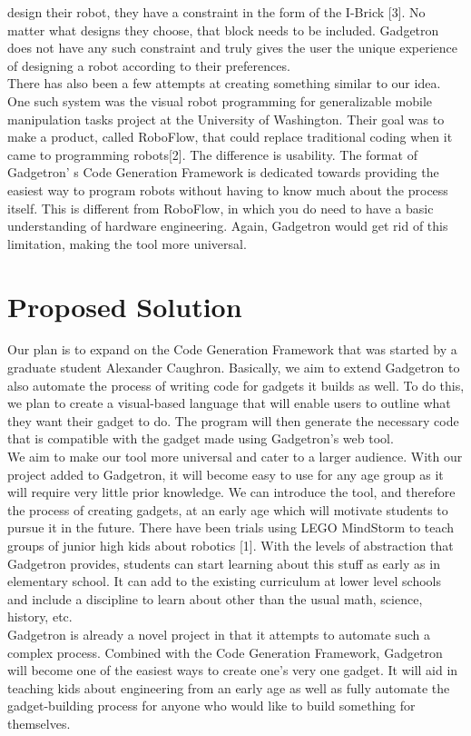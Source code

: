 \documentclass[12pt]{article}
\begin{document}
	design their robot, they have a constraint in the form of the I-Brick [3]. No matter what designs they choose, that block needs to be included. Gadgetron does not have any such constraint and truly gives the user the unique 
	experience of designing a robot according to their preferences.\\[7pt]
	There has also been a few attempts at creating something similar to our idea. One such system was the visual robot programming for generalizable mobile manipulation tasks project at the University of Washington. Their goal 
	was to make a product, called RoboFlow, that could replace traditional coding when it came to programming robots[2]. The difference is usability. The format of Gadgetron' s Code Generation Framework is dedicated towards
	providing the easiest way to program robots without having to know much about the process itself. This is different from RoboFlow, in which you do need to have a basic understanding of hardware engineering. Again, Gadgetron would get rid of this limitation, making the tool more universal.

\section{Proposed Solution}
Our plan is to expand on the Code Generation Framework that was started by a graduate student Alexander Caughron. Basically, we aim to extend Gadgetron to also automate the process of writing code for gadgets it builds as well. 
To do this, we plan to create a visual-based language that will enable users to outline what they want their gadget to do. The program will then generate the necessary code that is compatible with the gadget made using 
Gadgetron's web tool.\\[7pt]
We aim to make our tool more universal and cater to a larger audience. With our project added to Gadgetron, it will become easy to use for any age group as it will require very little prior knowledge. We can introduce the 
tool, and therefore the process of creating gadgets, at an early age which will motivate students to pursue it in the future. There have been trials using LEGO MindStorm to teach groups of junior high kids about robotics [1]. 
With the levels of abstraction that Gadgetron provides, students can start learning about this stuff as early as in elementary school. It can add to the existing curriculum at lower level schools and include a discipline to learn
about other than the usual math, science, history, etc.\\[7pt]
Gadgetron is already a novel project in that it attempts to automate such a complex process.  Combined with the Code Generation Framework, Gadgetron will become one of the easiest ways to create one's very one
gadget. It will aid in teaching kids about engineering from an early age as well as fully automate the gadget-building process for anyone who would like to build something for themselves. 
\end{document}
